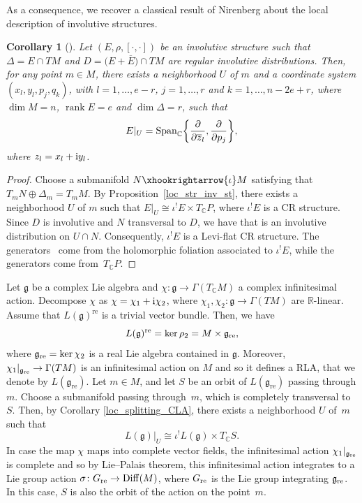 \documentclass[pdftex]{sigma}
\numberwithin{equation}{section}
\newtheorem{Corollary}[Theorem]{Corollary}
\newcommand{\R}{{\mathbb{R}}}
\newcommand{\C}{{\mathbb{C}}}
\newcommand{\g}{\mathfrak{g}}
\newcommand{\Diff}{\mathrm{Diff}}
\DeclareMathOperator{\re}{Re}
\DeclareMathOperator{\rk}{rank}
\DeclareMathOperator{\real}{re}
\begin{document}
 As a consequence, we recover a classical result of Nirenberg about the local description of involutive structures.
\begin{Corollary}[{\cite[Theorem 1]{nirenberg1958complex}}]
   Let $(E,\rho, [\cdot,\cdot])$ be an involutive structure such that $\Delta=E\cap TM$ and $D=\bigl(E+\overline{E}\bigr)\cap TM$ are regular involutive distributions. Then, for any point $m\in M$, there exists a neighborhood $U$ of $m$ and a coordinate system $(x_l, y_l, p_j, q_k)$, with $l=1,\dots, e-r$, $j=1,\dots, r$ and $k=1,\dots, n-2e+r$, where $\dim M=n$, $\rk E=e$ and $\dim \Delta=r$, such that
\[E|_U= {\rm Span}_{\C} \biggl\{\frac{\partial}{\partial \overline{z}_l}, \frac{\partial}{\partial p_j}\biggr\},\]
where $z_l=x_l+{\rm i}y_l$.
\end{Corollary}
\begin{proof}
Choose a submanifold $N\xhookrightarrow{\iota} M$ satisfying that $T_m N\oplus \Delta_m=T_m M$. By Proposition~\ref{loc_str_inv_st}, there exists a neighborhood $U$ of $m$ such that $E|_U\cong \iota^! E\times T_{\C}P$, where $\iota^! E$ is a CR structure. Since $D$ is involutive and $N$ transversal to $D$, we have that \smash{$D'=\re \bigl(\iota^! E + \overline{\iota^! E}\bigr)$} is an involutive distribution on $U\cap N$. Consequently, $\iota^{!}E$ is a Levi-flat CR structure. The generators~ come from the holomorphic foliation associated to $\iota^! E$, while the generators  come from~$T_{\C}P$.
\end{proof}

\begin{Example}
Let $\g$ be a complex Lie algebra and $\chi\colon \g\to \Gamma(T_{\C}M)$ a complex infinitesimal action. Decompose $\chi$ as $\chi=\chi_1+{\rm i}\chi_2$, where $\chi_1,\chi_2\colon \g \to \Gamma(TM)$ are $\R$-linear. Assume that $L(\g)^{\real}$ is a trivial vector bundle. Then, we have
\[L(\g)^{\real}=\ker \rho_2=M\times \g_{{\rm re}},\]
where $\g_{\rm re}=\ker\chi_2$ is a real Lie algebra contained in $\g$. Moreover, $\chi_1|_{\g_{\rm re}}\to \Gamma(TM)$ is an infinitesimal action on $M$ and so it defines a RLA, that we denote by $L(\g_{\real})$. Let $m\in M$, and let $S$ be an orbit of $L(\g_{\real})$ passing through $m$. Choose a submanifold  passing through~$m$, which is completely transversal to $S$. Then, by Corollary \ref{loc_splitting_CLA}, there exists a neighborhood $U$ of~$m$ such that
\[L(\g)|_{U}\cong \iota^! L(\g)\times T_{\C}S.\]
In case the map $\chi$ maps into complete vector fields, the infinitesimal action $\chi_1|_{\g_{\rm re}}$ is complete and so by Lie--Palais theorem, this infinitesimal action integrates to a Lie group action $\sigma\colon G_{\rm re}\to \Diff(M)$, where $G_{\rm re}$ is the Lie group integrating $\g_{\rm re}$. In this case, $S$ is also the orbit of the action on the point~$m$.
\end{Example}
\end{document}
